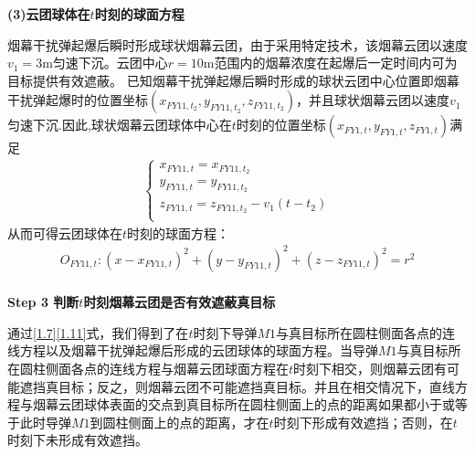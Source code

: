\documentclass[../main.tex]{subfiles}
\begin{document}
\noindent \textbf{(3)云团球体在$t$时刻的球面方程 }
\par 烟幕干扰弹起爆后瞬时形成球状烟幕云团，由于采用特定技术，该烟幕云团以速度$v_1=3$m匀速下沉。云团中心$r=10$m范围内的烟幕浓度在起爆后一定时间内可为目标提供有效遮蔽。
已知烟幕干扰弹起爆后瞬时形成的球状云团中心位置即烟幕干扰弹起爆时的位置坐标$\left( x_{FY11,t_2},y_{FY11,t_2},z_{FY11,t_2} \right)$，并且球状烟幕云团以速度$v_1$匀速下沉.因此,球状烟幕云团球体中心在$t$时刻的位置坐标$(x_{FY1,t}, y_{FY1,{t}}, z_{FY1,{t}})$满足
\begin{align}\label{1.10}
\left\{ \begin{array}{l}
	x_{FY11,t}=x_{FY11,t_2}\\
	y_{FY11,t}=y_{FY11,t_2}\\
	z_{FY11,t}=z_{FY11,t_2}-v_1\left( t-t_2 \right)\\
\end{array} \right. 
\end{align}
从而可得云团球体在$t$时刻的球面方程：
\begin{align}\label{1.11}
O_{FY11,t}:\left( x-x_{FY11,t} \right) ^2+\left( y-y_{FY11,t} \right) ^2+\left( z-z_{FY11,t} \right) ^2=r^2 
\end{align}
\\
\textbf{Step 3 判断$t$时刻烟幕云团是否有效遮蔽真目标}
\par 通过\eqref{1.7}\eqref{1.11}式，我们得到了在\( t \)时刻下导弹\( M1 \)与真目标所在圆柱侧面各点的连线方程以及烟幕干扰弹起爆后形成的云团球体的球面方程。当导弹\( M1 \)与真目标所在圆柱侧面各点的连线方程与烟幕云团球面方程在$t$时刻下相交，则烟幕云团有可能遮挡真目标；反之，则烟幕云团不可能遮挡真目标。并且在相交情况下，直线方程与烟幕云团球体表面的交点到真目标所在圆柱侧面上的点的距离如果都小于或等于此时导弹$M1$到圆柱侧面上的点的距离，才在$t$时刻下形成有效遮挡；否则，在$t$时刻下未形成有效遮挡。
\end{document}
